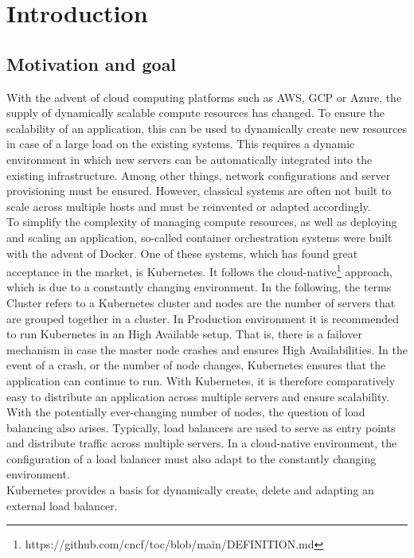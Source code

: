 \chapter{Introduction}


\section{Motivation and goal}
With the advent of cloud computing platforms such as AWS, GCP or Azure, the supply of dynamically scalable compute resources has changed.
To ensure the scalability of an application, this can be used to dynamically create new resources in case of a large load on the existing systems.
This requires a dynamic environment in which new servers can be automatically integrated into the existing infrastructure.
Among other things, network configurations and server provisioning must be ensured.
However, classical systems are often not built to scale across multiple hosts and must be reinvented or adapted accordingly.
\\
To simplify the complexity of managing compute resources, as well as deploying and scaling an application, so-called container orchestration systems were built with the advent of Docker.
One of these systems, which has found great acceptance in the market, is Kubernetes.
It follows the cloud-native\footnote{https://github.com/cncf/toc/blob/main/DEFINITION.md} approach, which is due to a constantly changing environment.
In the following, the terms Cluster refers to a Kubernetes cluster and nodes are the number of servers that are grouped together in a cluster.
In Production environment it is recommended to run Kubernetes in an High Available setup.
That is, there is a failover mechanism in case the master node crashes and ensures High Availabilities.
In the event of a crash, or the number of node changes, Kubernetes ensures that the application can continue to run.
With Kubernetes, it is therefore comparatively easy to distribute an application across multiple servers and ensure scalability.
\\
With the potentially ever-changing number of nodes, the question of load balancing also arises.
Typically, load balancers are used to serve as entry points and distribute traffic across multiple servers.
In a cloud-native environment, the configuration of a load balancer must also adapt to the constantly changing environment.
\\
Kubernetes provides a basis for dynamically create, delete and adapting an external load balancer.
